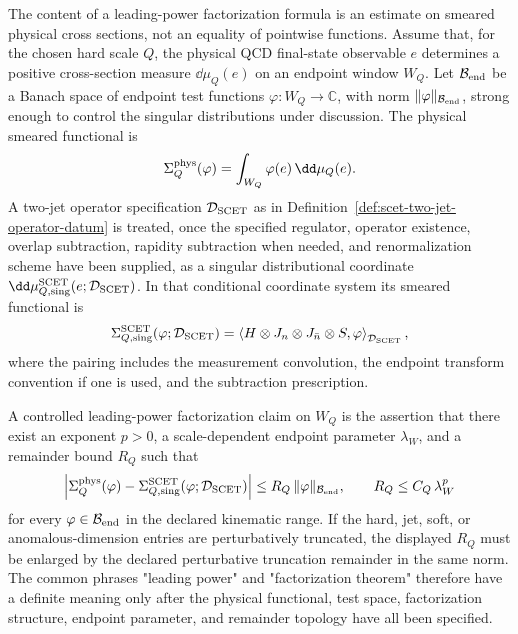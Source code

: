 \begin{controlledapproximation}
\label{ca:scet-distributional-factorization-estimate}
The content of a leading-power factorization formula is an estimate on
smeared physical cross sections, not an equality of pointwise functions.
Assume that, for the chosen hard scale \(Q\), the physical QCD final-state
observable \(e\) determines a positive cross-section measure
\(\dd\mu_Q(e)\) on an endpoint window \(W_Q\).  Let
\(\mathcal B_{\rm end}\) be a Banach space of endpoint test functions
\(\varphi\colon W_Q\to\mathbb C\), with norm
\(\|\varphi\|_{\mathcal B_{\rm end}}\), strong enough to control the singular
distributions under discussion.  The physical smeared functional is
\begin{equation}
  \Sigma_Q^{\rm phys}(\varphi)
  =
  \int_{W_Q}\varphi(e)\,\dd\mu_Q(e).
  \label{eq:scet-physical-smeared-functional}
\end{equation}
A two-jet operator specification \(\mathcal D_{\rm SCET}\) as in
Definition~\ref{def:scet-two-jet-operator-datum} is treated, once the
specified regulator, operator existence, overlap subtraction, rapidity
subtraction when needed, and renormalization scheme have been supplied, as a
singular distributional coordinate
\(\dd\mu_{Q,\rm sing}^{\rm SCET}(e;\mathcal D_{\rm SCET})\).  In that
conditional coordinate system its smeared functional is
\begin{equation}
  \Sigma_{Q,\rm sing}^{\rm SCET}(\varphi;\mathcal D_{\rm SCET})
  =
  \left\langle
  H\otimes J_n\otimes J_{\bar n}\otimes S,\varphi
  \right\rangle_{\mathcal D_{\rm SCET}},
  \label{eq:scet-factorized-smeared-functional}
\end{equation}
where the pairing includes the measurement convolution, the endpoint
transform convention if one is used, and the subtraction prescription.

A controlled leading-power factorization claim on \(W_Q\) is the assertion
that there exist an exponent \(p>0\), a scale-dependent endpoint parameter
\(\lambda_W\), and a remainder bound \(R_Q\) such that
\begin{equation}
  \left|
  \Sigma_Q^{\rm phys}(\varphi)
  -
  \Sigma_{Q,\rm sing}^{\rm SCET}(\varphi;\mathcal D_{\rm SCET})
  \right|
  \le
  R_Q\,\|\varphi\|_{\mathcal B_{\rm end}},
  \qquad
  R_Q\le C_Q\,\lambda_W^{p}
  \label{eq:scet-distributional-factorization-bound}
\end{equation}
for every \(\varphi\in\mathcal B_{\rm end}\) in the declared kinematic
range.  If the hard, jet, soft, or anomalous-dimension entries are
perturbatively truncated, the displayed \(R_Q\) must be enlarged by the
declared perturbative truncation remainder in the same norm.  The common
phrases "leading power" and "factorization theorem" therefore have a definite
meaning only after the physical functional, test space, factorization structure,
endpoint parameter, and remainder topology have all been specified.


\end{controlledapproximation}
